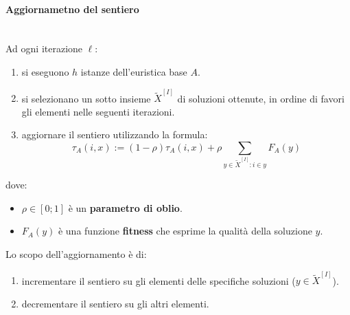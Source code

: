 \documentclass{article}
\begin{document}
\paragraph{Aggiornametno del sentiero}\mbox{}\\
Ad ogni iterazione $\ell$:
\begin{enumerate}
    \item si eseguono $h$ istanze dell'euristica base $A$.
    \item si selezionano un sotto insieme $\tilde{X}^{[I]}$ di soluzioni ottenute,
          in ordine di favori gli elementi nelle seguenti iterazioni.
    \item aggiornare il sentiero utilizzando la formula:
          $$\tau_A(i,x):=(1-\rho)\tau_A(i,x)+\rho\sum_{y\in\tilde{X}^{[I]}:i\in y}F_A(y)$$
\end{enumerate}
dove:
\begin{itemize}
    \item $\rho\in[0;1]$ è un \textbf{parametro di oblio}.
    \item $F_A(y)$ è una funzione \textbf{fitness} che esprime la qualità della soluzione $y$.
\end{itemize}
Lo scopo dell'aggiornamento è di:
\begin{enumerate}
    \item incrementare il sentiero su gli elementi delle specifiche soluzioni ($y\in\tilde{X}^{[I]}$).
    \item decrementare il sentiero su gli altri elementi.
\end{enumerate}
\end{document}
